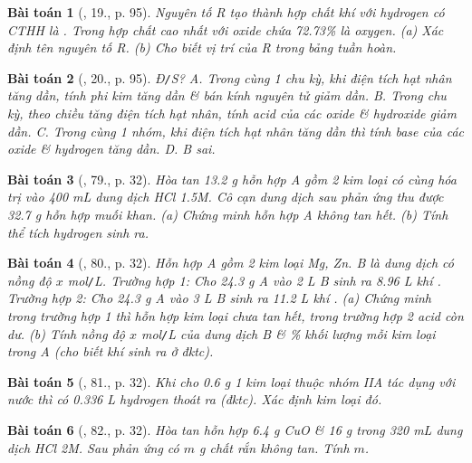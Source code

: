\documentclass{article}
\newtheorem{baitoan}{Bài toán}
\begin{document}
\begin{baitoan}[\cite{An_Hoa_Hoc_nang_cao_8_9}, 19., p. 95]
	Nguyên tố R tạo thành hợp chất khí với hydrogen có {\rm CTHH} là {\rm{}}. Trong hợp chất cao nhất với oxide chứa {\rm72.73\%} là oxygen. (a) Xác định tên nguyên tố R. (b) Cho biết vị trí của R trong bảng tuần hoàn.
\end{baitoan}

\begin{baitoan}[\cite{An_Hoa_Hoc_nang_cao_8_9}, 20., p. 95]
	{\rm Đ{\tt/}S?} {\sf A.} Trong cùng 1 chu kỳ, khi điện tích hạt nhân tăng dần, tính phi kim tăng dần \& bán kính nguyên tử giảm dần. {\sf B.} Trong chu kỳ, theo chiều tăng điện tích hạt nhân, tính acid của các oxide \& hydroxide giảm dần. {\sf C.} Trong cùng 1 nhóm, khi điện tích hạt nhân tăng dần thì tính base của các oxide \& hydrogen tăng dần. {\sf D. B} sai.
\end{baitoan}

\begin{baitoan}[\cite{An_400_BT_Hoa_Hoc_9}, 79., p. 32]
	Hòa tan {\rm13.2 g} hỗn hợp A gồm 2 kim loại có cùng hóa trị vào {\rm400 mL} dung dịch {\rm HCl 1.5M}. Cô cạn dung dịch sau phản ứng thu được {\rm32.7 g} hỗn hợp muối khan. (a) Chứng minh hỗn hợp A không tan hết. (b) Tính thể tích hydrogen sinh ra.
\end{baitoan}

\begin{baitoan}[\cite{An_400_BT_Hoa_Hoc_9}, 80., p. 32]
	Hỗn hợp A gồm 2 kim loại {\rm Mg, Zn}. B là dung dịch {\rm{}} có nồng độ $x$ {\rm mol{\tt/}L}. Trường hợp 1: Cho {\rm24.3 g} A vào {\rm 2 L} B sinh ra {\rm8.96 L} khí {\rm{}}. Trường hợp 2: Cho {\rm24.3 g} A vào {\rm 3 L} B sinh ra {\rm11.2 L} khí {\rm{}}. (a) Chứng minh trong trường hợp 1 thì hỗn hợp kim loại chưa tan hết, trong trường hợp 2 acid còn dư. (b) Tính nồng độ $x$ {\rm mol{\tt/}L} của dung dịch B \& {\rm\%} khối lượng mỗi kim loại trong A (cho biết khí {\rm{}} sinh ra ở đktc).
\end{baitoan}

\begin{baitoan}[\cite{An_400_BT_Hoa_Hoc_9}, 81., p. 32]
	Khi cho {\rm0.6 g} 1 kim loại thuộc nhóm IIA tác dụng với nước thì có {\rm0.336 L} hydrogen thoát ra (đktc). Xác định kim loại đó.
\end{baitoan}

\begin{baitoan}[\cite{An_400_BT_Hoa_Hoc_9}, 82., p. 32]
	Hòa tan hỗn hợp {\rm6.4 g CuO} \& {\rm16 g } trong {\rm320 mL} dung dịch {\rm HCl 2M}. Sau phản ứng có $m$ {\rm g} chất rắn không tan. Tính $m$.
\end{baitoan}
\end{document}
